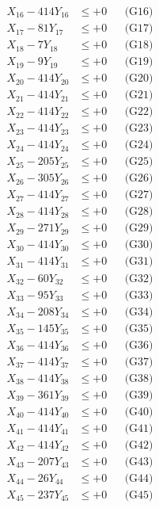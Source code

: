 \documentclass[a4paper,10pt]{article}
\begin{document}
{\begin{align}
X_{16} - 414Y_{16} &\leq +0 && \text{(G16)} \\
X_{17} - 81Y_{17} &\leq +0 && \text{(G17)} \\
X_{18} - 7Y_{18} &\leq +0 && \text{(G18)} \\
X_{19} - 9Y_{19} &\leq +0 && \text{(G19)} \\
X_{20} - 414Y_{20} &\leq +0 && \text{(G20)} \\
\allowbreak
X_{21} - 414Y_{21} &\leq +0 && \text{(G21)} \\
X_{22} - 414Y_{22} &\leq +0 && \text{(G22)} \\
X_{23} - 414Y_{23} &\leq +0 && \text{(G23)} \\
X_{24} - 414Y_{24} &\leq +0 && \text{(G24)} \\
X_{25} - 205Y_{25} &\leq +0 && \text{(G25)} \\
X_{26} - 305Y_{26} &\leq +0 && \text{(G26)} \\
X_{27} - 414Y_{27} &\leq +0 && \text{(G27)} \\
X_{28} - 414Y_{28} &\leq +0 && \text{(G28)} \\
X_{29} - 271Y_{29} &\leq +0 && \text{(G29)} \\
X_{30} - 414Y_{30} &\leq +0 && \text{(G30)} \\
\allowbreak
X_{31} - 414Y_{31} &\leq +0 && \text{(G31)} \\
X_{32} - 60Y_{32} &\leq +0 && \text{(G32)} \\
X_{33} - 95Y_{33} &\leq +0 && \text{(G33)} \\
X_{34} - 208Y_{34} &\leq +0 && \text{(G34)} \\
X_{35} - 145Y_{35} &\leq +0 && \text{(G35)} \\
X_{36} - 414Y_{36} &\leq +0 && \text{(G36)} \\
X_{37} - 414Y_{37} &\leq +0 && \text{(G37)} \\
X_{38} - 414Y_{38} &\leq +0 && \text{(G38)} \\
X_{39} - 361Y_{39} &\leq +0 && \text{(G39)} \\
X_{40} - 414Y_{40} &\leq +0 && \text{(G40)} \\
\allowbreak
X_{41} - 414Y_{41} &\leq +0 && \text{(G41)} \\
X_{42} - 414Y_{42} &\leq +0 && \text{(G42)} \\
X_{43} - 207Y_{43} &\leq +0 && \text{(G43)} \\
X_{44} - 26Y_{44} &\leq +0 && \text{(G44)} \\
X_{45} - 237Y_{45} &\leq +0 && \text{(G45)} \\

\end{align}}
\end{document}
